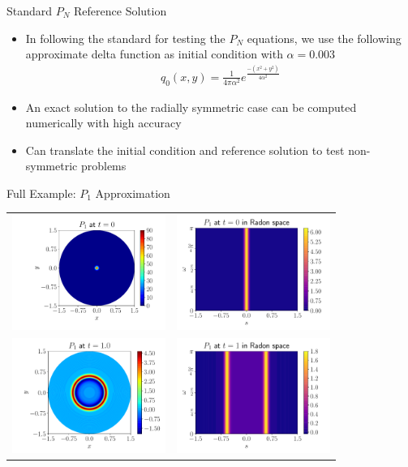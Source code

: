 \documentclass{beamer}
\begin{document}
\begin{frame}{Standard $P_N$ Reference Solution}
    \begin{itemize}
    	\item 
	        In following the standard for testing the $P_N$ equations, we use the following approximate delta function as initial condition with $\alpha = 0.003$
        \begin{align*}
            q_0(x, y) = \frac{1}{4\pi\alpha^2}e^{\frac{ -(x^2 + y^2) }{4\alpha^2} }
        \end{align*}
        \item 
	        An exact solution to the radially symmetric case can be computed numerically with high accuracy
	    \item
		    Can translate the initial condition and reference solution to test non-symmetric problems
    \end{itemize}
\end{frame}

\begin{frame}{Full Example: $P_1$ Approximation}
    \centering
    \begin{tabular}{>{\centering\arraybackslash}m{5cm} >{\centering\arraybackslash}m{5cm}}
      \includegraphics[width=5cm]{figures/physical_initial_p1.pdf} &
      \includegraphics[width=5cm]{figures/radon_initial_p1.pdf} \\
      \includegraphics[width=5cm]{figures/physical_final_p1.pdf}  &
      \includegraphics[width=5cm]{figures/radon_final_p1.pdf}
    \end{tabular}
\end{frame}
\end{document}
